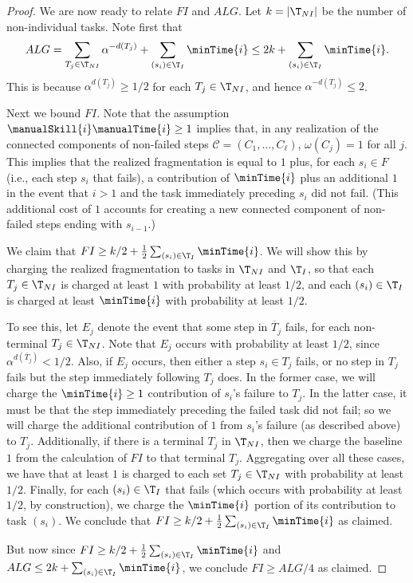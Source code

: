 \begin{proof}
    \medskip

    We are now ready to relate $FI$ and $ALG$.  
    Let $k = |\T_{NI}|$ be the number of non-individual tasks. 
    Note first that 
    \[ ALG = \sum_{T_j \in \T_{NI}} \alpha^{-d(T_j)} + \sum_{(s_i) \in \T_I} \minTime{i} \leq 2k + \sum_{(s_i) \in \T_I} \minTime{i}. \]  
    This is because $\alpha^{d(T_j)} \geq 1/2$ for each $T_j \in \T_{NI}$, and hence $\alpha^{-d(T_j)} \leq 2$.

    \medskip

    Next we bound $FI$.  
    Note that the assumption $\manualSkill{i}\manualTime{i} \geq 1$ implies that, in any realization of the connected components of non-failed steps $\mathcal{C} = (C_1, \dotsc, C_\ell)$, $\omega(C_j) = 1$ for all $j$. 
    This implies that the realized fragmentation is equal to $1$ plus, for each $s_i \in F$ (i.e., each step $s_i$ that fails), a contribution of $\minTime{i}$ plus an additional $1$ in the event that $i > 1$ and the task immediately preceding $s_i$ did not fail.  
    (This additional cost of $1$ accounts for creating a new connected component of non-failed steps ending with $s_{i-1}$.)
    
    We claim that $FI \geq k/2 + \frac{1}{2}\sum_{(s_i) \in \T_I} \minTime{i}$.  
    We will show this by charging  the realized fragmentation to tasks in $\T_{NI}$ and $\T_I$, so that each $T_j \in \T_{NI}$ is charged at least $1$ with probability at least $1/2$, and each $(s_i) \in \T_I$ is charged at least $\minTime{i}$ with probability at least $1/2$.
    
    To see this, let $E_j$ denote the event that some step in $\overline{T}_j$ fails, for each non-terminal $T_j \in \T_{NI}$.  
    Note that $E_j$ occurs with probability at least $1/2$, since $\alpha^{d(\overline{T}_j)} < 1/2$. 
    Also, if $E_j$ occurs, then either a step $s_i \in T_j$ fails, or no step in $T_j$ fails but the step immediately following $T_j$ does.  
    In the former case, we will charge the $\minTime{i} \geq 1$ contribution of $s_i$'s failure to $T_j$.  
    In the latter case, it must be that the step immediately preceding the failed task did not fail; so we will charge the additional contribution of $1$ from $s_i$'s failure (as described above) to $T_j$.  
    Additionally, if there is a terminal $T_j$ in $\T_{NI}$, then we charge the baseline $1$ from the calculation of $FI$ to that terminal $T_j$.  
    Aggregating over all these cases, we have that at least $1$ is charged to each set $T_j \in \T_{NI}$ with probability at least $1/2$.  
    Finally, for each $(s_i) \in \T_I$ that fails (which occurs with probability at least $1/2$, by construction), we charge the $\minTime{i}$ portion of its contribution to task $(s_i)$.  
    We conclude that $FI \geq k/2 + \frac{1}{2}\sum_{(s_i) \in \T_I}\minTime{i}$ as claimed.

    But now since $FI \geq k/2 + \frac{1}{2}\sum_{(s_i) \in \T_I}\minTime{i}$ and $ALG \leq 2k + \sum_{(s_i) \in \T_I}\minTime{i}$, we conclude $FI \geq ALG/4$ as claimed.
\end{proof}

